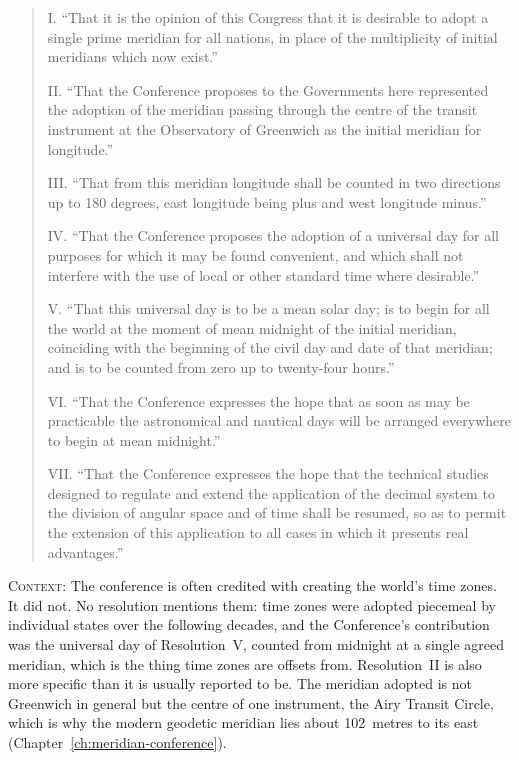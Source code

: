 \begin{quote}
I. ``That it is the opinion of this Congress that it is desirable to adopt a single prime meridian for all nations, in place of the multiplicity of initial meridians which now exist.''

II. ``That the Conference proposes to the Governments here represented the adoption of the meridian passing through the centre of the transit instrument at the Observatory of Greenwich as the initial meridian for longitude.''

III. ``That from this meridian longitude shall be counted in two directions up to 180 degrees, east longitude being plus and west longitude minus.''

IV. ``That the Conference proposes the adoption of a universal day for all purposes for which it may be found convenient, and which shall not interfere with the use of local or other standard time where desirable.''

V. ``That this universal day is to be a mean solar day; is to begin for all the world at the moment of mean midnight of the initial meridian, coinciding with the beginning of the civil day and date of that meridian; and is to be counted from zero up to twenty-four hours.''

VI. ``That the Conference expresses the hope that as soon as may be practicable the astronomical and nautical days will be arranged everywhere to begin at mean midnight.''

VII. ``That the Conference expresses the hope that the technical studies designed to regulate and extend the application of the decimal system to the division of angular space and of time shall be resumed, so as to permit the extension of this application to all cases in which it presents real advantages.''
\end{quote}

\noindent\textsc{Context}: The conference is often credited with creating the world's time zones. It did not. No resolution mentions them: time zones were adopted piecemeal by individual states over the following decades, and the Conference's contribution was the universal day of Resolution~V, counted from midnight at a single agreed meridian, which is the thing time zones are offsets from. Resolution~II is also more specific than it is usually reported to be. The meridian adopted is not Greenwich in general but the centre of one instrument, the Airy Transit Circle, which is why the modern geodetic meridian lies about 102~metres to its east (Chapter~\ref{ch:meridian-conference}).

